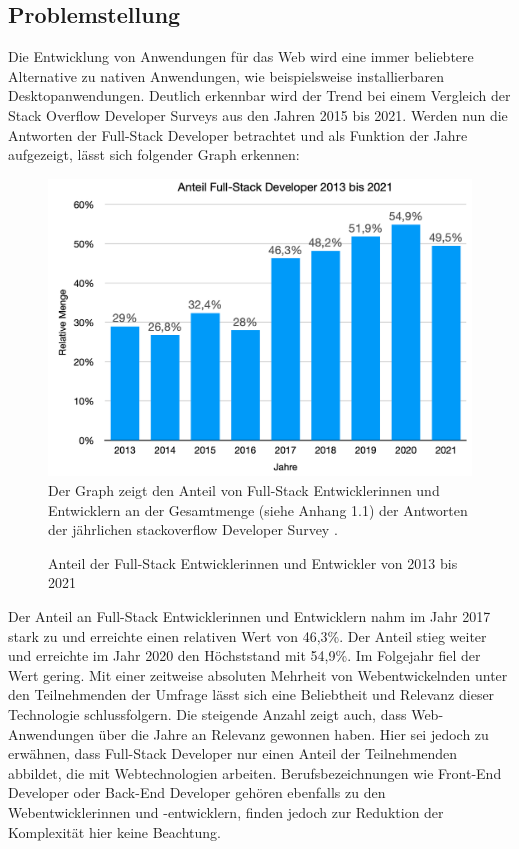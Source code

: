 \documentclass[a4paper]{scrartcl}
\begin{document}
\newpage

\subsection{Problemstellung}
Die Entwicklung von Anwendungen für das Web wird eine immer beliebtere Alternative zu nativen Anwendungen, wie beispielsweise installierbaren Desktopanwendungen. Deutlich erkennbar wird der Trend bei einem Vergleich der Stack Overflow Developer Surveys aus den Jahren 2015 bis 2021. Werden nun die Antworten der Full-Stack Developer betrachtet und als Funktion der Jahre aufgezeigt, lässt sich folgender Graph erkennen: 

\begin{figure}[H]
	\centering
		\caption{Anteil der Full-Stack Entwicklerinnen und Entwickler von 2013 bis 2021}
	\includegraphics[scale=0.28]{_assets/stackoverflow_fullstack_developers.png} \\
	\justifying
	\small
	Der Graph zeigt den Anteil von Full-Stack Entwicklerinnen und Entwicklern an der Gesamtmenge (siehe Anhang 1.1) der Antworten der jährlichen stackoverflow Developer Survey \autocite{stackoverflow_2015,stackoverflow_2016,stackoverflow_2017,stackoverflow_2018,stackoverflow_2019,stackoverflow_2020,stackoverflow_2021}.  
\end{figure}

Der Anteil an Full-Stack Entwicklerinnen und Entwicklern nahm im Jahr 2017 stark zu und erreichte einen relativen Wert von 46,3\%. Der Anteil stieg weiter und erreichte im Jahr 2020 den Höchststand mit 54,9\%. Im Folgejahr fiel der Wert gering. Mit einer zeitweise absoluten Mehrheit von Webentwickelnden unter den Teilnehmenden der Umfrage lässt sich eine Beliebtheit und Relevanz dieser Technologie schlussfolgern. Die steigende Anzahl zeigt auch, dass Web-Anwendungen über die Jahre an Relevanz gewonnen haben. Hier sei jedoch zu erwähnen, dass Full-Stack Developer nur einen Anteil der Teilnehmenden abbildet, die mit Webtechnologien arbeiten. Berufsbezeichnungen wie Front-End Developer oder Back-End Developer gehören ebenfalls zu den Webentwicklerinnen und -entwicklern, finden jedoch zur Reduktion der Komplexität hier keine Beachtung. \\ 
\end{document}
